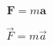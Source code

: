 \begin{equation}
\bm{F} = m \bm{a}
\end{equation}

\begin{equation}
\vec{F} = m \vec{a}
\end{equation}